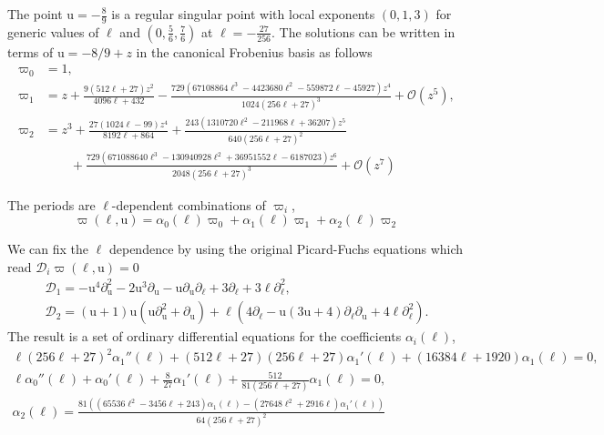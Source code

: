 \documentclass[11pt, a4paper]{article}
\newcommand{\ur}{\mathrm{u}}
\numberwithin{equation}{section}
\begin{document}
The point $\ur = -\tfrac89$ is a regular singular point with local exponents $(0, 1, 3)$ for generic values of $\ell$ and $(0, \tfrac56, \tfrac76)$ at $\ell = -\frac{27}{256}$. The solutions can be written in terms of $\ur = -8/9 + z$ in the canonical Frobenius basis as follows
\begin{equation}
  \begin{aligned}
    \varpi_0 &= 1, \\
    \varpi_1 &= z+\frac{9 (512 \ell+27) z^2}{4096 \ell+432}-\frac{729 \left(67108864 \ell^3-4423680 \ell^2-559872 \ell-45927\right) z^4}{1024 (256 \ell+27)^3}+\mathcal{O}(z^5), \\
    \varpi_2 &= z^3+\frac{27 (1024 \ell-99) z^4}{8192 \ell+864}+\frac{243 \left(1310720 \ell^2-211968 \ell+36207\right) z^5}{640 (256 \ell+27)^2}\\
    &\qquad +\frac{729 \left(671088640 \ell^3-130940928 \ell^2+36951552 \ell-6187023\right) z^6}{2048 (256 \ell+27)^3} +\mathcal{O}(z^7)
  \end{aligned}
\end{equation}

The periods are $\ell$-dependent combinations of $\varpi_i$,
\begin{equation}
  \varpi(\ell, \ur) = \alpha_0(\ell) \varpi_0 + \alpha_1(\ell) \varpi_1 + \alpha_2(\ell) \varpi_2
\end{equation}

We can fix the $\ell$ dependence by using the original Picard-Fuchs equations which read $\mathcal{D}_i \varpi(\ell, \ur) = 0$
\begin{equation}\label{eq:PicardFuchsD1D2}
  \begin{gathered}
    \mathcal{D}_1 = -\ur^4 \partial_\ur^2-2 \ur^3 \partial_\ur-\ur \partial_\ur \partial_\ell+3 \partial_\ell+3 \ell \partial_\ell^2, \\
    \mathcal{D}_2 = (\ur+1) \ur \left(\ur \partial_\ur^2+ \partial_\ur\right) +\ell \left(4 \partial_\ell-\ur (3 \ur+4) \partial_\ell \partial_\ur +4 \ell \partial_\ell^2\right).
  \end{gathered}
\end{equation}
The result is a set of ordinary differential equations for the coefficients $\alpha_i(\ell)$,
\begin{gather}
  \ell (256 \ell+27)^2 \alpha_1''(\ell)+(512 \ell+27) (256 \ell+27) \alpha_1'(\ell)+(16384 \ell+1920) \alpha_1(\ell) = 0, \label{eq:pf-branch-point-1}\\
  \ell \alpha_0''(\ell)+\alpha_0'(\ell)+\frac{8}{27}\alpha_1'(\ell)+\frac{512}{81(256 \ell+27)}\alpha_1(\ell)=0, \label{eq:pf-branch-point-2}\\
  \alpha_2(\ell) = \frac{81 \left(\left(65536 \ell^2-3456 \ell+243\right) \alpha_1(\ell)-\left(27648 \ell^2+2916 \ell\right) \alpha_1'(\ell)\right)}{64 (256 \ell+27)^2}
\end{gather}
\end{document}
